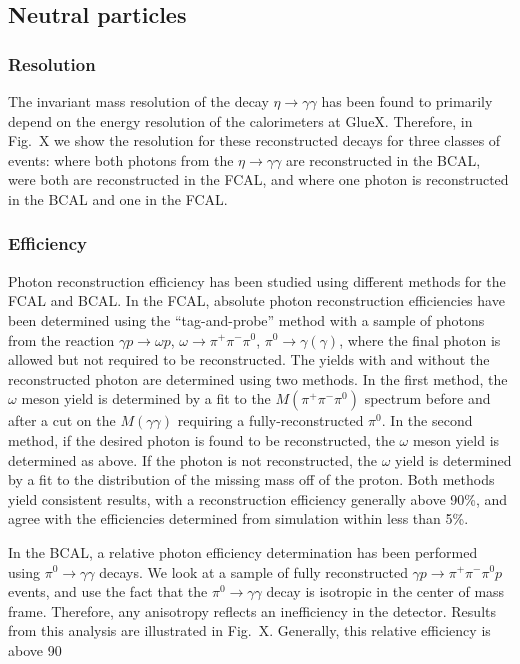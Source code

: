 \subsection{Neutral particles \label{sec:perfneutral}}

\subsubsection{Resolution \label{sec:perfneutralresol}}

The invariant mass resolution of the decay $\eta \to \gamma \gamma$ has been found to primarily depend on the energy resolution of the calorimeters at GlueX.  Therefore, in Fig.~X we show the resolution for these reconstructed decays for three classes of events: where both photons from the  $\eta \to \gamma \gamma$ are reconstructed in the BCAL, were both are reconstructed in the FCAL, and where one photon is reconstructed in the BCAL and one in the FCAL.

\subsubsection{Efficiency \label{sec:perfneutraleff}}

Photon reconstruction efficiency has been studied using different methods for the FCAL and BCAL.  In the FCAL, absolute photon reconstruction efficiencies have been determined using the ``tag-and-probe'' method with a sample of photons from the reaction $\gamma p \to \omega p$, $\omega \to \pi^+\pi^-\pi^0$, $\pi^0 \to \gamma (\gamma)$, where the final photon is allowed but not required to be reconstructed.  The yields with and without the reconstructed photon are determined using two methods.  In the first method, the $\omega$ meson yield is determined by a fit to the $M(\pi^+\pi^-\pi^0)$ spectrum before and after a cut on the $M(\gamma\gamma)$ requiring a fully-reconstructed $\pi^0$.  In the second method, if the desired photon is found to be reconstructed, the  $\omega$ meson yield is determined as above.  If the photon is not reconstructed, the $\omega$ yield is determined by a fit to the distribution of the missing mass off of the proton.
Both methods yield consistent results, with a reconstruction efficiency generally above 90\%, and agree with the efficiencies determined from simulation within less than 5\%.

In the BCAL, a relative photon efficiency determination has been performed using $\pi^0\to\gamma\gamma$ decays.  We look at a sample of fully reconstructed $\gamma p \to  \pi^+\pi^-\pi^0 p$ events, and use the fact that the $\pi^0\to\gamma\gamma$ decay is isotropic in the center of mass frame.  Therefore, any anisotropy reflects an inefficiency in the detector. Results from this analysis are illustrated in Fig.~X. Generally, this relative efficiency is above 90%

